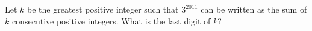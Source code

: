 Let $k$ be the greatest positive integer such that $3^{2011}$ can be written as the sum of $k$ consecutive positive integers. What is the last digit of $k$?
